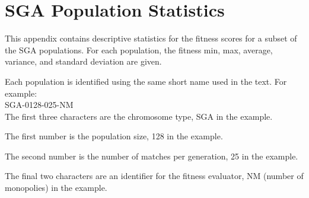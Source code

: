 \clearpage
\chapter{SGA Population Statistics}
\label{appendix:sgastats}

This appendix contains descriptive statistics for the fitness scores for a
subset of the SGA populations. For each population, the fitness min,
max, average, variance, and standard deviation are given.

Each population is identified using the same short name used in the text. For
example: \\

SGA-0128-025-NM \\ 

The first three characters are the chromosome type, SGA in the example.

The first number is the population size, 128 in the example.

The second number is the number of matches per generation, 25 in the example.

The final two characters are an identifier for the fitness evaluator, NM
(number of monopolies) in the example.

\newpage




